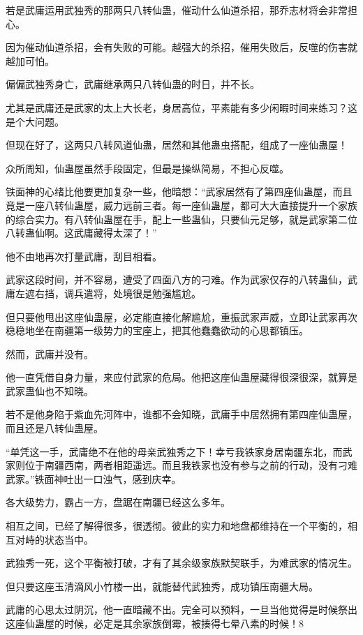 \begin{this_body}
若是武庸运用武独秀的那两只八转仙蛊，催动什么仙道杀招，那乔志材将会非常担心。

因为催动仙道杀招，会有失败的可能。越强大的杀招，催用失败后，反噬的伤害就越加可怕。

偏偏武独秀身亡，武庸继承两只八转仙蛊的时日，并不长。

尤其是武庸还是武家的太上大长老，身居高位，平素能有多少闲暇时间来练习？这是个大问题。

但现在好了，这两只八转风道仙蛊，居然和其他蛊虫搭配，组成了一座仙蛊屋！

众所周知，仙蛊屋虽然手段固定，但最是操纵简易，不担心反噬。

铁面神的心绪比他要更加复杂一些，他暗想：“武家居然有了第四座仙蛊屋，而且竟是一座八转仙蛊屋，威力远前三者。每一座仙蛊屋，都可大大直接提升一个家族的综合实力。有八转仙蛊屋在手，配上一些蛊仙，只要仙元足够，就是武家第二位八转蛊仙啊。这武庸藏得太深了！”

他不由地再次打量武庸，刮目相看。

武家这段时间，并不容易，遭受了四面八方的刁难。作为武家仅存的八转蛊仙，武庸左遮右挡，调兵遣将，处境很是勉强尴尬。

但只要他甩出这座仙蛊屋，必定能直接化解尴尬，重振武家声威，立即让武家再次稳稳地坐在南疆第一级势力的宝座上，把其他蠢蠢欲动的心思都镇压。

然而，武庸并没有。

他一直凭借自身力量，来应付武家的危局。他把这座仙蛊屋藏得很深很深，就算是武家蛊仙也不知晓。

若不是他身陷于紫血先河阵中，谁都不会知晓，武庸手中居然拥有第四座仙蛊屋，而且还是八转仙蛊屋。

“单凭这一手，武庸绝不在他的母亲武独秀之下！幸亏我铁家身居南疆东北，而武家则位于南疆西南，两者相距遥远。而且我铁家也没有参与之前的行动，没有刁难武家。”铁面神吐出一口浊气，感到庆幸。

各大级势力，霸占一方，盘踞在南疆已经这么多年。

相互之间，已经了解得很多，很透彻。彼此的实力和地盘都维持在一个平衡的，相互对峙的状态当中。

武独秀一死，这个平衡被打破，才有了其余级家族默契联手，为难武家的情况生。

但只要这座玉清滴风小竹楼一出，就能替代武独秀，成功镇压南疆大局。

武庸的心思太过阴沉，他一直暗藏不出。完全可以预料，一旦当他觉得是时候祭出这座仙蛊屋的时候，必定是其余家族倒霉，被揍得七晕八素的时候！8

\end{this_body}

